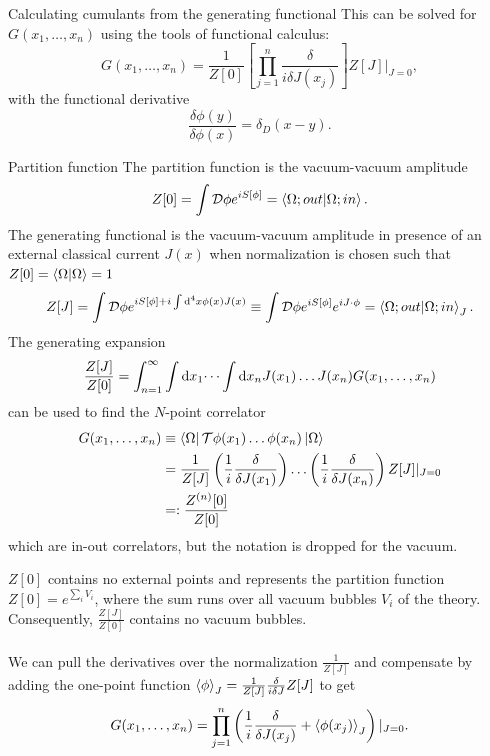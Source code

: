 \begin{mybox}{Calculating cumulants from the generating functional}
	This can be solved for $G(x_1,\dots,x_n)$ using the tools of functional calculus:
	\begin{equation}
	G(x_1,\dots,x_n) = \frac{1}{Z[0]} \left[\prod_{j=1}^{n} \frac{\delta}{i \delta J(x_j)}\right] Z[J] |_{J=0},
	\end{equation}
	with the functional derivative
	\begin{equation}
	\frac{\delta \phi(y) }{\delta \phi(x)} = \delta_D(x-y).
	\end{equation}
\end{mybox}
\begin{mybox}{Partition function}
	The partition function is the vacuum-vacuum amplitude
	\begin{equation}
		Z[0] = \int \mathcal{D}\phi e^{i S[\phi]} = \bra{ \Omega;out}\ket{\Omega;in}.
	\end{equation}
	The generating functional is the vacuum-vacuum amplitude in presence of an external classical current $J(x)$ when normalization is chosen such that $Z[0]=\braket{\Omega}{\Omega}=1$
	\begin{equation}
		Z[J]= \int \mathcal{D}\phi e^{i S[\phi] + i \int \mathrm{d}^4 x \phi(x) J(x)} \equiv \int \mathcal{D}\phi e^{iS[\phi]} e^{i J\cdot \phi} = \braket{ \Omega;out}{\Omega;in}_J.
	\end{equation}
	The generating expansion
	\begin{equation}
	\frac{Z[J]}{Z[0]} = \int_{n=1}^{\infty} \int \mathrm{d} x_1 \dots \int \mathrm{d} x_n J(x_1) \dots J(x_n) G(x_1,\dots,x_n) 
	\end{equation}
	can be used to find the $N$-point correlator
	\begin{align}
		G(x_1,\dots,x_n) &\equiv \bra{ \Omega}\mathcal{T}\phi(x_1)\dots \phi(x_n)\ket{\Omega} \\
		&= \frac{1}{Z[J]} \left(\frac{1}{i} \frac{\delta}{\delta J(x_1)}\right)\dots \left(\frac{1}{i} \frac{\delta}{\delta J(x_n)}\right) Z[J] |_{J=0} \nonumber \\
		&=: \frac{Z^{(n)}[0]}{Z[0]}\nonumber
	\end{align}
which are in-out correlators, but the notation is dropped for the vacuum.
	
\end{mybox}
$Z[0]$ contains no external points and represents the partition function $Z[0]=e^{\sum_i V_i}$, where the sum runs over all vacuum bubbles $V_i$ of the theory. Consequently, $\frac{Z[J]}{Z[0]}$ contains no vacuum bubbles.\\
\\
We can pull the derivatives over the normalization $\frac{1}{Z[J]}$ and compensate by adding the one-point function $\expval{\phi}_J = \frac{1}{Z[J]}\frac{\delta}{i\delta J} Z[J]$ to get
\begin{equation}
\label{eq:cumulantsExpression}
	G(x_1,\dots,x_n) = \prod_{j=1}^{n} \left(\frac{1}{i} \frac{\delta}{\delta J(x_j)} + \expval{\phi(x_j)}_J\right) |_{J=0}.
\end{equation}


